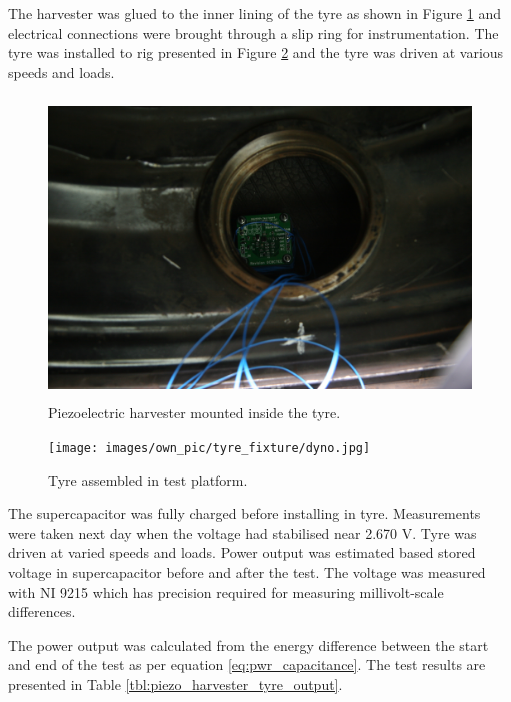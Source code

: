 The harvester was glued to the inner lining of the tyre as shown in Figure \ref{fig:harvester_potted} and electrical connections were brought through a slip ring for instrumentation. The tyre was installed to rig presented in Figure \ref{fig:tyre_platform} and the tyre was driven at various speeds and loads. 

\begin{figure}[htb]
\begin{center}
\includegraphics[height=8cm]{images/own_pic/tyre_fixture/piezo_bq_mount.jpg}
\end{center}
\caption{\label{fig:harvester_potted}Piezoelectric harvester mounted inside the tyre.}
\end{figure}

\begin{figure}[htb]
\begin{center}
\texttt{[image: images/own\_pic/tyre\_fixture/dyno.jpg]}
\end{center}
\caption{\label{fig:tyre_platform} Tyre assembled in test platform.}
\end{figure}

The supercapacitor was fully charged before installing in tyre. Measurements were taken next day when the voltage had stabilised near 2.670 V. Tyre was driven at varied speeds and loads. Power output was estimated based stored voltage in supercapacitor before and after the test. The voltage was measured with NI 9215 \cite{ni9215} which has precision required for measuring millivolt-scale differences. 

The power output was calculated from the energy difference between the start and end of the test as per equation \eqref{eq:pwr_capacitance}. The test results are presented in Table \ref{tbl:piezo_harvester_tyre_output}.

